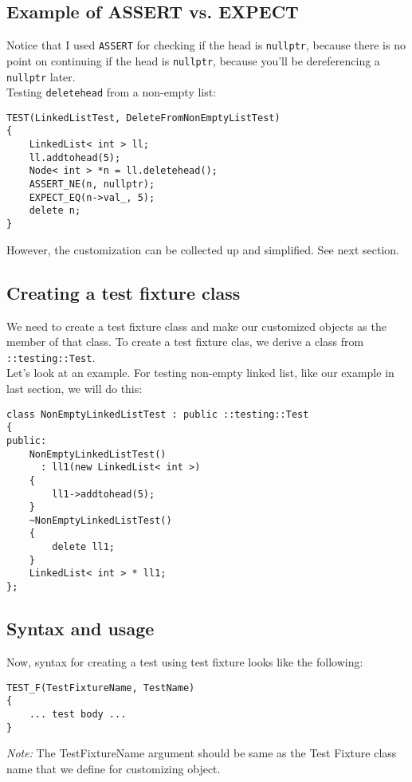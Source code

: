 \subsection{Example of ASSERT vs. EXPECT}
Notice that I used \verb!ASSERT! for checking if the head is \verb!nullptr!,
because there is no point on continuing if the head is \verb!nullptr!, because
you'll be dereferencing a \verb!nullptr! later. \\
Testing \verb!deletehead! from a non-empty list:
\begin{Verbatim}[frame=single]
TEST(LinkedListTest, DeleteFromNonEmptyListTest)
{
    LinkedList< int > ll;
    ll.addtohead(5);
    Node< int > *n = ll.deletehead();
    ASSERT_NE(n, nullptr);
    EXPECT_EQ(n->val_, 5);
    delete n;
}
\end{Verbatim}

However, the customization can be collected up and simplified. See next section.


\subsection{Creating a test fixture class}
We need to create a test fixture class and make our customized objects as the
member of that class. To create a test fixture clas, we derive a class from \verb!::testing::Test!. \\
Let's look at an example. For testing non-empty linked list, like our example in last section, we will do this:
\begin{Verbatim}[frame=single]
class NonEmptyLinkedListTest : public ::testing::Test
{
public:
    NonEmptyLinkedListTest()
      : ll1(new LinkedList< int >)
    {
        ll1->addtohead(5);
    }
    ~NonEmptyLinkedListTest()
    {
        delete ll1;
    }
    LinkedList< int > * ll1;
};
\end{Verbatim}

\newpage
\subsection{Syntax and usage}
Now, syntax for creating a test using test fixture looks like the following:

\begin{Verbatim}[frame=single]
TEST_F(TestFixtureName, TestName)
{
    ... test body ...
}  
\end{Verbatim}
\emph{Note: }The TestFixtureName argument should be same as the Test Fixture
class name that we define for customizing object.

